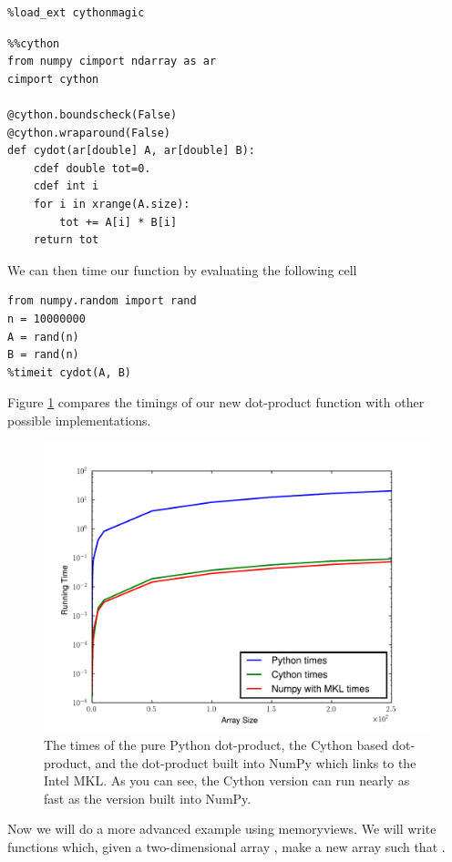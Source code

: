 \begin{lstlisting}
%load_ext cythonmagic
\end{lstlisting}

\begin{lstlisting}
%%cython
from numpy cimport ndarray as ar
cimport cython

@cython.boundscheck(False)
@cython.wraparound(False)
def cydot(ar[double] A, ar[double] B):
    cdef double tot=0.
    cdef int i
    for i in xrange(A.size):
        tot += A[i] * B[i]
    return tot
\end{lstlisting}
We can then time our function by evaluating the following cell
\begin{lstlisting}
from numpy.random import rand
n = 10000000
A = rand(n)
B = rand(n)
%timeit cydot(A, B)
\end{lstlisting}

Figure \ref{cython:dot} compares the timings of our new dot-product function with other possible implementations.

\begin{figure}
\centering
\includegraphics[width=\textwidth]{dot.pdf}
\caption{
The times of the pure Python dot-product, the Cython based dot-product, and the dot-product built into NumPy which links to the Intel MKL.
As you can see, the Cython version can run nearly as fast as the version built into NumPy.
}
\label{cython:dot}
\end{figure}

Now we will do a more advanced example using memoryviews.
We will write functions which, given a two-dimensional array , make a new array  such that
.


